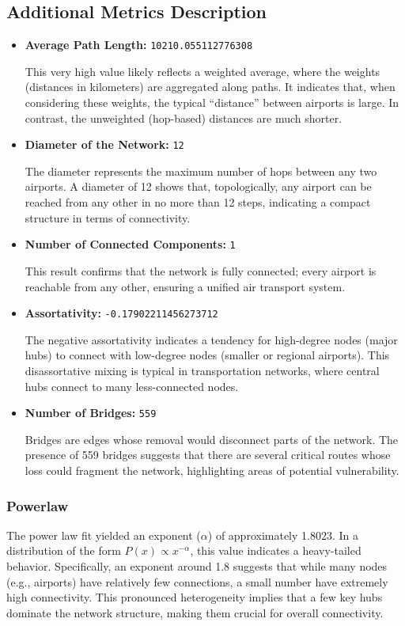 \documentclass[12pt]{article}
\begin{document}
    \subsection{Additional Metrics Description}\label{subsec:additional-metrics-description}

    \begin{itemize}
        \item \textbf{Average Path Length:} \texttt{10210.055112776308}

        This very high value likely reflects a weighted average, where the weights (distances in kilometers) are aggregated along paths. It indicates that, when considering these weights, the typical ``distance'' between airports is large. In contrast, the unweighted (hop-based) distances are much shorter.

        \item \textbf{Diameter of the Network:} \texttt{12}

        The diameter represents the maximum number of hops between any two airports. A diameter of 12 shows that, topologically, any airport can be reached from any other in no more than 12 steps, indicating a compact structure in terms of connectivity.

        \item \textbf{Number of Connected Components:} \texttt{1}

        This result confirms that the network is fully connected; every airport is reachable from any other, ensuring a unified air transport system.

        \item \textbf{Assortativity:} \texttt{-0.17902211456273712}

        The negative assortativity indicates a tendency for high-degree nodes (major hubs) to connect with low-degree nodes (smaller or regional airports). This disassortative mixing is typical in transportation networks, where central hubs connect to many less-connected nodes.

        \item \textbf{Number of Bridges:} \texttt{559}

        Bridges are edges whose removal would disconnect parts of the network. The presence of 559 bridges suggests that there are several critical routes whose loss could fragment the network, highlighting areas of potential vulnerability.
    \end{itemize}

    \subsubsection{Powerlaw}
    The power law fit yielded an exponent ($\alpha$) of approximately 1.8023. In a distribution of the form \( P(x) \propto x^{-\alpha} \), this value indicates a heavy-tailed behavior. Specifically, an exponent around 1.8 suggests that while many nodes (e.g., airports) have relatively few connections, a small number have extremely high connectivity. This pronounced heterogeneity implies that a few key hubs dominate the network structure, making them crucial for overall connectivity.
\end{document}
